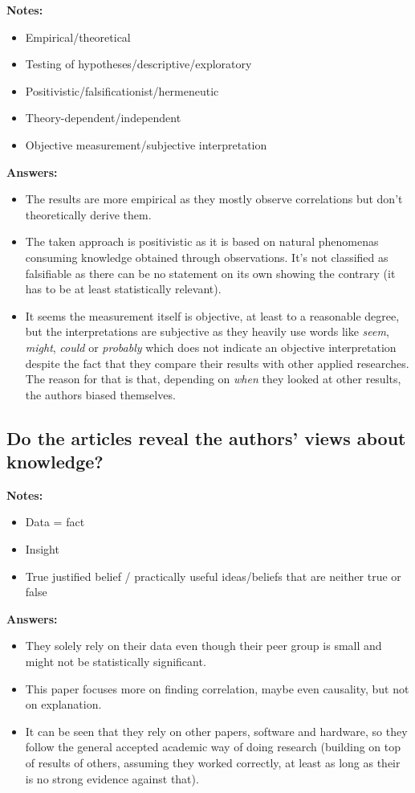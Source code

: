 \documentclass[11pt]{scrartcl}
\begin{document}
\textbf{Notes:}
\begin{itemize}
  \item Empirical/theoretical
  \item Testing of hypotheses/descriptive/exploratory
  \item Positivistic/falsificationist/hermeneutic
  \item Theory-dependent/independent
  \item Objective measurement/subjective interpretation
\end{itemize}

\textbf{Answers:}
\begin{itemize}
  \item The results are more empirical as they mostly observe correlations but don't theoretically derive them.
  \item The taken approach is positivistic as it is based on natural  phenomenas consuming knowledge obtained through observations. It's not classified as falsifiable as there can be no statement on its own showing the contrary (it has to be at least statistically relevant).
  \item It seems the measurement itself is objective, at least to a reasonable degree, but the interpretations are subjective as they heavily use words like \textit{seem}, \textit{might}, \textit{could} or \textit{probably} which does not indicate an objective interpretation despite the fact that they compare their results with other applied researches. The reason for that is that, depending on \textit{when} they looked at other results, the authors biased themselves.
\end{itemize}

\bigbreak

\subsection{Do the articles reveal the authors’ views about knowledge?}

\textbf{Notes:}
\begin{itemize}
  \item Data = fact
  \item Insight
  \item True justified belief / practically useful ideas/beliefs that are neither true or false
\end{itemize}

\textbf{Answers:}
\begin{itemize}
  \item They solely rely on their data even though their peer group is small and might not be statistically significant.
  \item This paper focuses more on finding correlation, maybe even causality, but not on explanation.
  \item It can be seen that they rely on other papers, software and hardware, so they follow the general accepted academic way of doing research (building on top of results of others, assuming they worked correctly, at least as long as their is no strong evidence against that).
\end{itemize}
\end{document}
